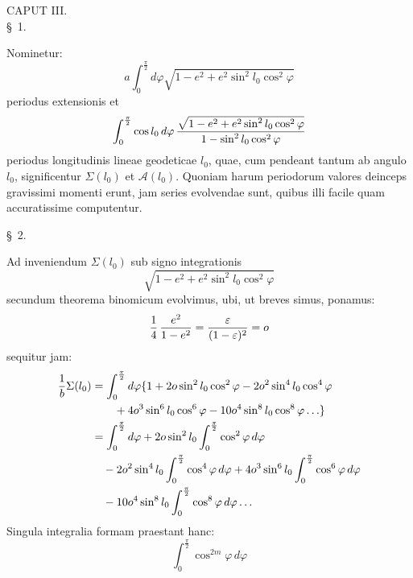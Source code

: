 \begin{center}
{\large CAPUT III.}\\[0.8em]
\S\ 1.
\end{center}

Nominetur:
\[
 a\int_0^{\frac\pi2} d\varphi\sqrt{1-e^2+e^2\sin^2 l_0\cos^2\varphi}
\]
periodus extensionis et
\[
 \int_0^{\frac\pi2}\cos l_0\,d\varphi\,
 {\sqrt{1-e^2+e^2\sin^2 l_0\cos^2\varphi}\over 1-\sin^2 l_0\cos^2\varphi}
\]
periodus longitudinis lineae geodeticae $l_0$, quae, cum pendeant tantum ab angulo $l_0$, significentur $\Sigma(l_0)$ et $\mathcal A(l_0)$. Quoniam harum periodorum valores deinceps gravissimi momenti erunt, jam series evolvendae sunt, quibus illi facile quam accuratissime computentur.

\begin{center}\S\ 2.\end{center}

Ad inveniendum $\Sigma(l_0)$ sub signo integrationis
\[
 \sqrt{1-e^2+e^2\sin^2 l_0\cos^2\varphi}
\]
secundum theorema binomicum evolvimus, ubi, ut breves simus, ponamus:
\[
 {1\over4}\,{e^2\over1-e^2}={\varepsilon\over(1-\varepsilon)^2}=o
\]
sequitur jam:
\[
\begin{aligned}
 {1\over b}\Sigma(l_0)
 &=\int_0^{\frac\pi2}d\varphi\{1+2o\sin^2l_0\cos^2\varphi-2o^2\sin^4l_0\cos^4\varphi\\
 &\qquad{}+4o^3\sin^6l_0\cos^6\varphi-10o^4\sin^8l_0\cos^8\varphi\ldots\}\\
 &=\int_0^{\frac\pi2}d\varphi+2o\sin^2l_0\int_0^{\frac\pi2}\cos^2\varphi\,d\varphi\\
 &\quad{}-2o^2\sin^4l_0\int_0^{\frac\pi2}\cos^4\varphi\,d\varphi
 +4o^3\sin^6l_0\int_0^{\frac\pi2}\cos^6\varphi\,d\varphi\\
 &\quad{}-10o^4\sin^8l_0\int_0^{\frac\pi2}\cos^8\varphi\,d\varphi\ldots
\end{aligned}
\]
Singula integralia formam praestant hanc:
\[
 \int_0^{\frac\pi2}\cos^{2m}\varphi\,d\varphi
\]

